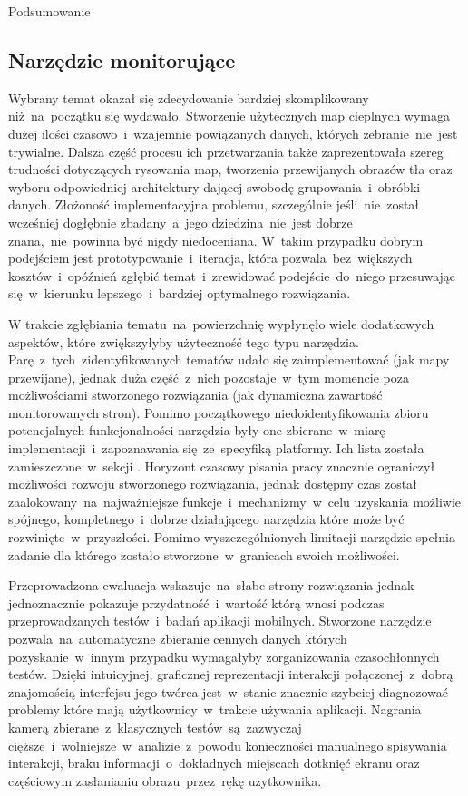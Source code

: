 \begin{chapter}{Podsumowanie}
	\subsection{Narzędzie monitorujące}
	Wybrany temat okazał się zdecydowanie bardziej skomplikowany niż~na~początku się wydawało. Stworzenie użytecznych map cieplnych wymaga dużej ilości czasowo~i~wzajemnie powiązanych danych, których zebranie~nie~jest trywialne. Dalsza część procesu ich przetwarzania także zaprezentowała szereg trudności dotyczących rysowania map, tworzenia przewijanych obrazów tła oraz wyboru odpowiedniej architektury dającej swobodę grupowania~i~obróbki danych. Złożoność implementacyjna problemu, szczególnie jeśli~nie~został wcześniej dogłębnie zbadany~a~jego dziedzina~nie~jest dobrze znana,~nie~powinna być nigdy niedoceniana. W~takim przypadku dobrym podejściem jest prototypowanie~i~iteracja, która pozwala~bez~większych kosztów~i~opóźnień zgłębić temat~i~zrewidować podejście~do~niego przesuwając się~w~kierunku lepszego~i~bardziej optymalnego rozwiązania.
	
	W trakcie zgłębiania tematu~na~powierzchnię wypłynęło wiele dodatkowych aspektów, które zwiększyłyby użyteczność tego typu narzędzia. Parę~z~tych~zidentyfikowanych tematów udało się zaimplementować (jak mapy przewijane), jednak duża część~z~nich pozostaje~w~tym momencie poza możliwościami stworzonego rozwiązania (jak dynamiczna zawartość monitorowanych stron). Pomimo początkowego niedoidentyfikowania zbioru potencjalnych funkcjonalności narzędzia były one zbierane~w~miarę implementacji~i~zapoznawania się~ze~specyfiką platformy. Ich lista została zamieszczone~w~sekcji . Horyzont czasowy pisania pracy znacznie ograniczył możliwości rozwoju stworzonego rozwiązania, jednak dostępny czas został zaalokowany~na~najważniejsze funkcje~i~mechanizmy~w~celu uzyskania możliwie spójnego, kompletnego~i~dobrze działającego narzędzia które może być rozwinięte~w~przyszłości. Pomimo wyszczególnionych limitacji narzędzie spełnia zadanie dla którego zostało stworzone~w~granicach swoich możliwości. 
	
	Przeprowadzona ewaluacja wskazuje~na~słabe strony rozwiązania jednak jednoznacznie pokazuje przydatność~i~wartość którą wnosi podczas przeprowadzanych testów~i~badań aplikacji mobilnych. Stworzone narzędzie pozwala~na~automatyczne zbieranie cennych danych których pozyskanie~w~innym przypadku wymagałyby zorganizowania czasochłonnych testów. Dzięki intuicyjnej, graficznej reprezentacji interakcji połączonej~z~dobrą znajomością interfejsu jego twórca jest~w~stanie znacznie szybciej diagnozować problemy które mają użytkownicy~w~trakcie używania aplikacji. Nagrania kamerą zbierane~z~klasycznych testów~są~zazwyczaj cięższe~i~wolniejsze~w~analizie~z~powodu konieczności manualnego spisywania interakcji, braku informacji~o~dokładnych miejscach dotknięć ekranu oraz częściowym zasłanianiu obrazu~przez~rękę użytkownika. 


\end{chapter}

